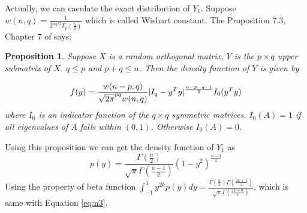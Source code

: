 \documentclass{article}
\DeclarePairedDelimiter\abs{\lvert}{\rvert}
\newtheorem{proposition}{Proposition}
\begin{document}
Actually, we can caculate the exact distribution of $Y_1$.
Suppose $w(n, q) = \frac{1}{2^{nq/2} \Gamma_p(\frac{n}{2})}$ which is called Wishart constant. 
The Proposition 7.3, Chapter 7 of \cite{eaton1989group} says:
\begin{proposition}
Suppose $X$ is a random orthogonal matrix, $Y$ is the $p\times q$ upper submatrix of $X$. $q\leq p $ and $p+q \leq n$. Then the density function of $Y$ is given by

\begin{equation}
f(y) = \frac{w(n-p, q)}{\sqrt{2\pi}^{pq}w(n,q)} \abs{I_q - y^T y}^{\frac{n-p-q-1}{2}}I_0(y^T y)
\end{equation}
where $I_0$ is an indicator function of the $q\times q $ symmetric matrices. $I_0(A)=1$ if all eigenvalues of $A$ falls within $(0,1)$. Otherwise $I_0(A)=0$.
\end{proposition}
Using this proposition we can get the density function of $Y_1$ as
\begin{equation}
p(y) = \frac{\Gamma(\frac{n}{2})}{\sqrt{\pi}\Gamma(\frac{n-1}{2})} (1-y^2)^{\frac{n-3}{2}}
\end{equation}
Using the property of beta function 
$\int_{-1}^{1} y^{2k} p(y)dy = \frac{\Gamma(\frac{n}{2})\Gamma(\frac{2k+1}{2})}
{\sqrt{\pi} \Gamma(\frac{2k+n}{2})}$, which is same with Equation \eqref{eq:n3}.
\end{document}
